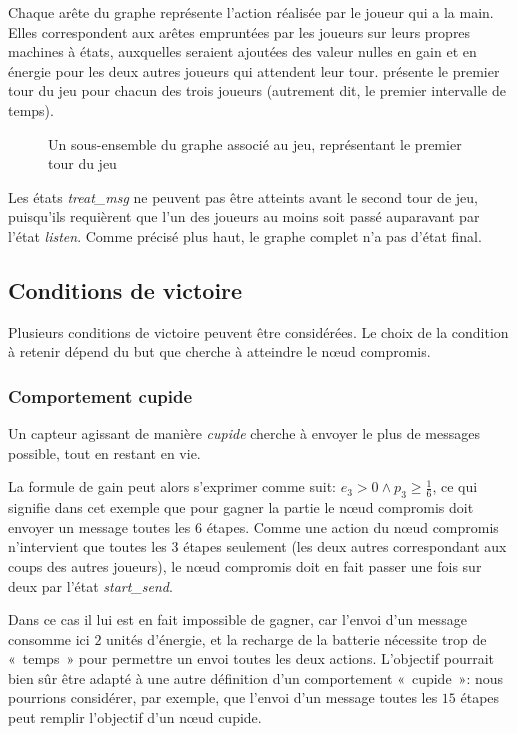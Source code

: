 Chaque arête du graphe représente l'action réalisée par le joueur qui a la main.
Elles correspondent aux arêtes empruntées par les joueurs sur leurs propres machines à états, auxquelles seraient ajoutées des valeur nulles en gain et en énergie pour les deux autres joueurs qui attendent leur tour.
 présente le premier tour du jeu pour chacun des trois joueurs (autrement dit, le premier intervalle de temps).
\begin{figure*}[p]
    \centering
    
    \caption{Un sous-ensemble du graphe associé au jeu, représentant le premier tour du jeu}\label{tj:fig:autFirstTurn}
\end{figure*}
Les états \emph{treat\_msg} ne peuvent pas être atteints avant le second tour de jeu, puisqu'ils requièrent que l'un des joueurs au moins soit passé auparavant par l'état \emph{listen}.
Comme précisé plus haut, le graphe complet n'a pas d'état final.

    \subsection{Conditions de victoire}

Plusieurs conditions de victoire peuvent être considérées.
Le choix de la condition à retenir dépend du but que cherche à atteindre le nœud compromis.

        \subsubsection{Comportement cupide}
Un capteur agissant de manière \emph{cupide} cherche à envoyer le plus de messages possible, tout en restant en vie.

La formule de gain peut alors s'exprimer comme suit: $e_3 > 0 \wedge p_3 \geq \frac16$, ce qui signifie dans cet exemple que pour gagner la partie le nœud compromis doit envoyer un message toutes les $6$ étapes.
Comme une action du nœud compromis n'intervient que toutes les $3$ étapes seulement (les deux autres correspondant aux coups des autres joueurs), le nœud compromis doit en fait passer une fois sur deux par l'état \emph{start\_send}.

Dans ce cas il lui est en fait impossible de gagner, car l'envoi d'un message consomme ici $2$ unités d'énergie, et la recharge de la batterie nécessite trop de « temps » pour permettre un envoi toutes les deux actions.
L'objectif pourrait bien sûr être adapté à une autre définition d'un comportement « cupide »: nous pourrions considérer, par exemple, que l'envoi d'un message toutes les $15$ étapes peut remplir l'objectif d'un nœud cupide.

